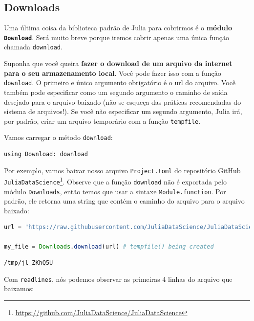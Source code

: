 \documentclass[
  notoc %
]{tufte-book}
\DeclareRobustCommand{\href}[2]{#2\footnote{\url{#1}}}
\newcommand{\passthrough}[1]{#1}
\begin{document}
\hypertarget{sec:downloads}{%
\subsection{Downloads}\label{sec:downloads}}

Uma última coisa da biblioteca padrão de Julia para cobrirmos é o
\textbf{módulo \passthrough{\lstinline!Download!}}. Será muito breve
porque iremos cobrir apenas uma única função chamada
\passthrough{\lstinline!download!}.

Suponha que você queira \textbf{fazer o download de um arquivo da
internet para o seu armazenamento local}. Você pode fazer isso com a
função \passthrough{\lstinline!download!}. O primeiro e único argumento
obrigatório é o url do arquivo. Você também pode especificar como um
segundo argumento o caminho de saída desejado para o arquivo baixado
(não se esqueça das práticas recomendadas do sistema de arquivos!). Se
você não especificar um segundo argumento, Julia irá, por padrão, criar
um arquivo temporário com a função \passthrough{\lstinline!tempfile!}.

Vamos carregar o método \passthrough{\lstinline!download!}:

\begin{lstlisting}
using Download: download
\end{lstlisting}

Por exemplo, vamos baixar nosso arquivo
\passthrough{\lstinline!Project.toml!} do
\href{https://github.com/JuliaDataScience/JuliaDataScience}{repositório
GitHub \passthrough{\lstinline!JuliaDataScience!}}. Observe que a função
\passthrough{\lstinline!download!} não é exportada pelo módulo
\passthrough{\lstinline!Downloads!}, então temos que usar a sintaxe
\passthrough{\lstinline!Module.function!}. Por padrão, ele retorna uma
string que contém o caminho do arquivo para o arquivo baixado:

\begin{lstlisting}[language=Julia]
url = "https://raw.githubusercontent.com/JuliaDataScience/JuliaDataScience/main/Project.toml"

my_file = Downloads.download(url) # tempfile() being created
\end{lstlisting}

\begin{lstlisting}[language=Output]
/tmp/jl_ZKhQ5U
\end{lstlisting}

Com \passthrough{\lstinline!readlines!}, nós podemos observar as
primeiras 4 linhas do arquivo que baixamos:
\end{document}
